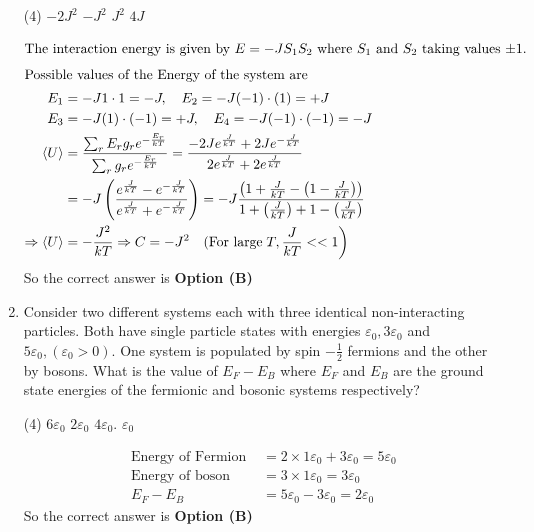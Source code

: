 \begin{enumerate}
\begin{tasks}(4)
	\task[\textbf{A.}]  $-2 J^{2}$
	\task[\textbf{B.}] $-J^{2}$
	\task[\textbf{C.}] $J^{2}$
	\task[\textbf{D.}] $4 J$
\end{tasks}
\begin{answer}
	\begin{align*}
	\intertext{The interaction energy is given by $E=-J S_{1} S_{2}$ where $S_{1}$ and $S_{2}$ taking values $\pm 1$.}
	\intertext{Possible values of the Energy of the system are}
	E_{1}&=-J 1 \cdot 1=-J, \quad E_{2}=-J(-1) \cdot(1)=+J\\
	E_{3}&=-J(1) \cdot(-1)=+J, \quad E_{4}=-J(-1) \cdot(-1)=-J\\
	\langle U\rangle&=\frac{\sum_{r} E_{r} g_{r} e^{-\frac{E_{r}}{k T}}}{\sum_{r} g_{r} e^{-\frac{E_{r}}{k T}}}=\frac{-2 J e^{\frac{J}{k T}}+2 J e^{-\frac{J}{k T}}}{2 e^{\frac{J}{k T}}+2 e^{\frac{J}{k T}}}\\&=-J\left(\frac{e^{\frac{J}{k T}}-e^{-\frac{J}{k T}}}{e^{\frac{J}{k T}}+e^{-\frac{J}{k T}}}\right)=-J \frac{\left(1+\frac{J}{k T}-\left(1-\frac{J}{k T}\right)\right)}{1+\left(\frac{J}{k T}\right)+1-\left(\frac{J}{k T}\right)}\\
	\Rightarrow\langle U\rangle&=-\frac{J^{2}}{k T} \Rightarrow C=-J^{2} \quad \text{(For large} \left.T, \frac{J}{k T}<<1\right)
	\end{align*}
	So the correct answer is \textbf{Option (B)}
\end{answer}

	\item Consider two different systems each with three identical non-interacting particles. Both have single particle states with energies $\varepsilon_{0}, 3 \varepsilon_{0}$ and $5 \varepsilon_{0},\left(\varepsilon_{0}>0\right)$. One system is populated by spin $-\frac{1}{2}$ fermions and the other by bosons. What is the value of $E_{F}-E_{B}$ where $E_{F}$ and $E_{B}$ are the ground state energies of the fermionic and bosonic systems respectively?
    	{}

\begin{tasks}(4)
	\task[\textbf{A.}] $6 \varepsilon_{0}$
	\task[\textbf{B.}] $2 \varepsilon_{0}$
	\task[\textbf{C.}] $4 \varepsilon_{0}$.
	\task[\textbf{D.}] $\varepsilon_{0}$
\end{tasks}
\begin{answer}
	\begin{align*}
	\text{Energy of Fermion }&=2 \times 1 \varepsilon_{0}+3 \varepsilon_{0}=5 \varepsilon_{0}\\
	\text{Energy of boson }&=3 \times 1 \varepsilon_{0}=3 \varepsilon_{0}\\
	E_{F}-E_{B}&=5 \varepsilon_{0}-3 \varepsilon_{0}=2 \varepsilon_{0}
	\end{align*}
	So the correct answer is \textbf{Option (B)}
\end{answer}


\end{enumerate}
